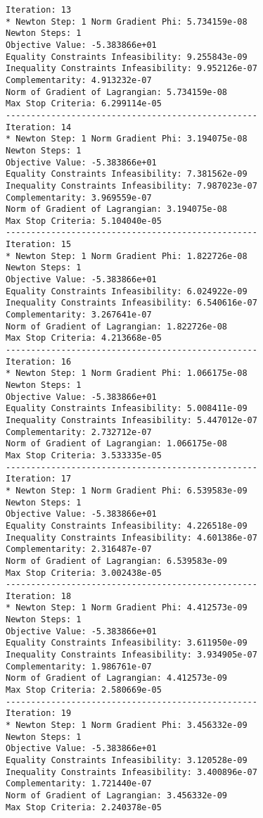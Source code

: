 \documentclass{article}
\begin{document}
\scriptsize
\begin{minipage}[t]{0.45\textwidth}
\begin{verbatim}
Iteration: 13
* Newton Step: 1 Norm Gradient Phi: 5.734159e-08
Newton Steps: 1
Objective Value: -5.383866e+01
Equality Constraints Infeasibility: 9.255843e-09
Inequality Constraints Infeasibility: 9.952126e-07
Complementarity: 4.913232e-07
Norm of Gradient of Lagrangian: 5.734159e-08
Max Stop Criteria: 6.299114e-05
--------------------------------------------------
Iteration: 14
* Newton Step: 1 Norm Gradient Phi: 3.194075e-08
Newton Steps: 1
Objective Value: -5.383866e+01
Equality Constraints Infeasibility: 7.381562e-09
Inequality Constraints Infeasibility: 7.987023e-07
Complementarity: 3.969559e-07
Norm of Gradient of Lagrangian: 3.194075e-08
Max Stop Criteria: 5.104040e-05
--------------------------------------------------
Iteration: 15
* Newton Step: 1 Norm Gradient Phi: 1.822726e-08
Newton Steps: 1
Objective Value: -5.383866e+01
Equality Constraints Infeasibility: 6.024922e-09
Inequality Constraints Infeasibility: 6.540616e-07
Complementarity: 3.267641e-07
Norm of Gradient of Lagrangian: 1.822726e-08
Max Stop Criteria: 4.213668e-05
--------------------------------------------------
Iteration: 16
* Newton Step: 1 Norm Gradient Phi: 1.066175e-08
Newton Steps: 1
Objective Value: -5.383866e+01
Equality Constraints Infeasibility: 5.008411e-09
Inequality Constraints Infeasibility: 5.447012e-07
Complementarity: 2.732712e-07
Norm of Gradient of Lagrangian: 1.066175e-08
Max Stop Criteria: 3.533335e-05
--------------------------------------------------
Iteration: 17
* Newton Step: 1 Norm Gradient Phi: 6.539583e-09
Newton Steps: 1
Objective Value: -5.383866e+01
Equality Constraints Infeasibility: 4.226518e-09
Inequality Constraints Infeasibility: 4.601386e-07
Complementarity: 2.316487e-07
Norm of Gradient of Lagrangian: 6.539583e-09
Max Stop Criteria: 3.002438e-05
--------------------------------------------------
Iteration: 18
* Newton Step: 1 Norm Gradient Phi: 4.412573e-09
Newton Steps: 1
Objective Value: -5.383866e+01
Equality Constraints Infeasibility: 3.611950e-09
Inequality Constraints Infeasibility: 3.934905e-07
Complementarity: 1.986761e-07
Norm of Gradient of Lagrangian: 4.412573e-09
Max Stop Criteria: 2.580669e-05
--------------------------------------------------
Iteration: 19
* Newton Step: 1 Norm Gradient Phi: 3.456332e-09
Newton Steps: 1
Objective Value: -5.383866e+01
Equality Constraints Infeasibility: 3.120528e-09
Inequality Constraints Infeasibility: 3.400896e-07
Complementarity: 1.721440e-07
Norm of Gradient of Lagrangian: 3.456332e-09
Max Stop Criteria: 2.240378e-05
\end{verbatim}
\end{minipage}
\end{document}
